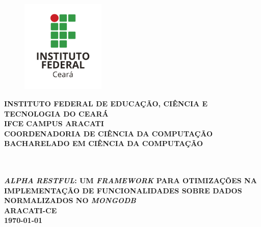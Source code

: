 \thispagestyle{empty}
\vfill
\begin{center}

\begin{figure}[t]
\centering
\includegraphics[width=4cm]{figuras/ifce-ceara.png}%
\end{figure}
\vspace{0.5 cm}
{\normalsize\bfseries INSTITUTO FEDERAL DE EDUCAÇÃO, CIÊNCIA E TECNOLOGIA DO CEARÁ} \\
{\normalsize\bfseries IFCE CAMPUS ARACATI} \\
{\normalsize\bfseries COORDENADORIA DE CIÊNCIA DA COMPUTAÇÃO}  \\ 
{\normalsize\bfseries BACHARELADO EM CIÊNCIA DA COMPUTAÇÃO}  \\ 

\vspace*{1in}
\begin{large} \bfseries \imprimirautor \end{large}\\[0.4in]

\vspace*{4cm}
\noindent \\
\large\bfseries{\uppercase{\textit{Alpha} \textit{Restful}: Um \textit{Framework} para Otimizações na Implementação de Funcionalidades Sobre Dados Normalizados no \textit{MongoDB}}} \\
\vfill
\normalsize\bfseries{ARACATI-CE\\\today}

\end{center}
\normalsize